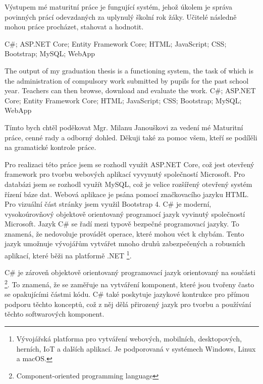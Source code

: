 \documentclass[a4paper, 12pt]{report}
\begin{document}
	\titulniStrana
	
	\anotace
	Výstupem mé maturitní práce je fungující systém, jehož úkolem je správa povinných prácí odevzdaných za uplynulý školní rok žáky. Učitelé následně mohou práce procházet, stahovat a hodnotit.

	\klicovaslova
	C\#; ASP.NET Core; Entity Framework Core; HTML; JavaScript; CSS; Bootstrap; MySQL; WebApp

	\annotation
	The output of my graduation thesis is a functioning system, the task of which is the administration of compulsory work submitted by pupils for the past school year. Teachers can then browse, download and evaluate the work.
	\keywords
	C\#; ASP.NET Core; Entity Framework Core; HTML; JavaScript; CSS; Bootstrap; MySQL; WebApp

	\podekovani
	Tímto bych chtěl poděkovat Mgr. Milanu Janouškovi za vedení mé Maturitní práce, cenné rady a odborný dohled. Děkuji také za pomoc všem, kteří se podílěli na gramatické kontrole práce.
	
	\obsah
	
		Pro realizaci této práce jsem se rozhodl využít ASP.NET Core, což jest otevřený framework pro tvorbu webových aplikací vyvynutý společností Microsoft. Pro 	 databázi jsem se rozhodl využít MySQL, což je velice rozšířený otevřený systém řízení báze dat. Webová aplikace je psána pomocí značkovacího jazyku HTML. Pro vizuální část stránky jsem využil Bootstrap 4.
			C\# je moderní, vysokoúrovňový objektově orientovaný programocí jazyk vyvinutý společností Microsoft. Jazyk C\# se řadí mezi typově bezpečné programovací jazyky. To znamená, že nedovoluje provádět operace, které mohou véct k chybám. Tento jazyk umožnuje vývojářům vytvářet mnoho druhů zabezpečených a robusních aplikací, které běži na platformě .NET \footnote{Vývojářská platforma pro vytváření webových, mobilních, desktopových, herních, IoT a dalších aplikací. Je podporovaná v systémech Windows, Linux a macOS.}.\par
			C\# je zároveň objektově orientovaný programovací jazyk orientovaný na součásti \footnote{Component-oriented programming language}. To znamená, že se zaměřuje na vytváření komponent, které jsou tvořeny často se opakujícími částmi kódu. C\# také poskytuje jazykové kontrukce pro přímou podporu těchto konceptů, což z něj dělá přirozený jazyk pro tvorbu a používání těchto softwarových komponent.
	\cite{CSharp}
\end{document}
